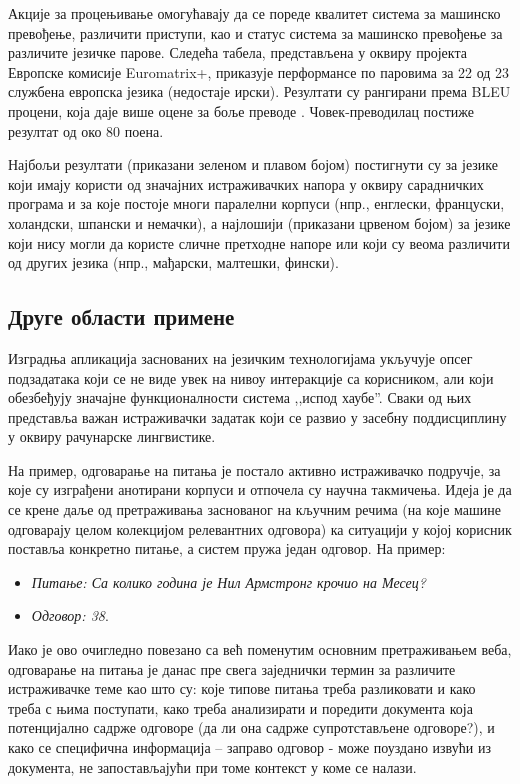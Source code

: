 \begin{multicols}{2}
Акције за процењивање омогућавају да се пореде квалитет система за машинско превођење, различити приступи, као и статус система за машинско превођење за различите језичке парове. Следећа табела, представљена у оквиру пројекта Европске комисије Euromatrix+, приказује перформансе по паровима за 22 од 23 службена европска језика (недостаје ирски). Резултати су рангирани према BLEU процени, која даје више оцене за боље преводе \cite{bleu1}. Човек-преводилац постиже резултат од око 80 поена. 

Најбољи резултати (приказани зеленом и плавом бојом) постигнути су за језике који имају користи од значајних истраживачких напора у оквиру сарадничких програма и за које постоје многи паралелни корпуси (нпр., енглески, француски, холандски, шпански и немачки), а најлошији (приказани црвеном бојом) за језике који нису могли да користе сличне претходне напоре или који су веома различити од других језика (нпр., мађарски, малтешки, фински). 

 \subsection {Друге области примене}
   
Изградња апликација заснованих на језичким технологијама укључује опсег подзадатака који се не виде увек на нивоу интеракције са корисником, али који обезбеђују значајне функционалности система ,,испод хаубе''. Сваки од њих представља важан истраживачки задатак који се развио у засебну поддисциплину у оквиру рачунарске лингвистике.

На пример, одговарање на питања је постало активно истраживачко подручје, за које су изграђени анотирани корпуси и отпочела су научна такмичења. Идеја је да се крене даље од претраживања заснованог на кључним речима (на које машине одговарају целом колекцијом релевантних одговора) ка ситуацији у којој корисник поставља конкретно питање, а систем пружа један одговор. На пример: 
\begin{itemize}
\item[] \textit{Питање: Са колико година је Нил Армстронг крочио на Месец?} 
\item[] \textit{Одговор: 38}. 
\end{itemize}

Иако је ово очигледно повезано са већ поменутим основним претраживањем веба, одговарање на питања је данас пре свега заједнички термин за различите истраживачке теме као што су: које типове питања треба разликовати и како треба с њима поступати, како треба анализирати и поредити документа која потенцијално садрже одговоре (да ли она садрже супротстављене одговоре?), и како се специфична информација – заправо одговор -  може поуздано извући из документа, не запостављајући при томе контекст у коме се налази. 


\end{multicols}
